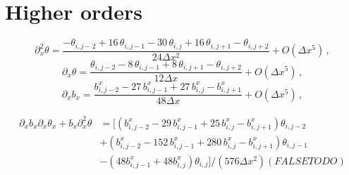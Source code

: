 \documentclass[notitlepage]{revtex4-2}
\begin{document}
\section{Higher orders}

\begin{equation}
\partial_x^2\theta = \frac{-\theta_{i,j-2}+16\,\theta_{i,j-1}-30\,\theta_{i,j}+16\,\theta_{i,j+1}-\theta_{i,j+2}}{24\Delta x^2}+O(\Delta x^5)\,,
\end{equation}
\begin{equation}
\partial_x\theta = \frac{\theta_{i,j-2}-8\,\theta_{i,j-1}+8\,\theta_{i,j+1}-\theta_{i,j+2}}{12\Delta x}+O(\Delta x^5)\,,
\end{equation}
\begin{equation}
\partial_x b_x = \frac{b^x_{i,j-2}-27\,b^x_{i,j-1}+27\,b^x_{i,j}-b^x_{i,j+1}}{48\Delta x}+O(\Delta x^5)\,,
\end{equation}

\begin{align}
\partial_xb_x\partial_x\theta_x + b_x\partial_x^2\theta &=
\Big[(b^x_{i,j-2}-29\,b^x_{i,j-1}+25\,b^x_{i,j}-b^x_{i,j+1})\theta_{i,j-2}\\
&+(b^x_{i,j-2}-152\,b^x_{i,j-1}+280\,b^x_{i,j}-b^x_{i,j+1})\theta_{i,j-1}\\
&-(48b^x_{i,j-1}+48b^x_{i,j})\theta_{i,j}\Big]/ (576\Delta x^2) (FALSE TODO)
\end{align}
\end{document}
